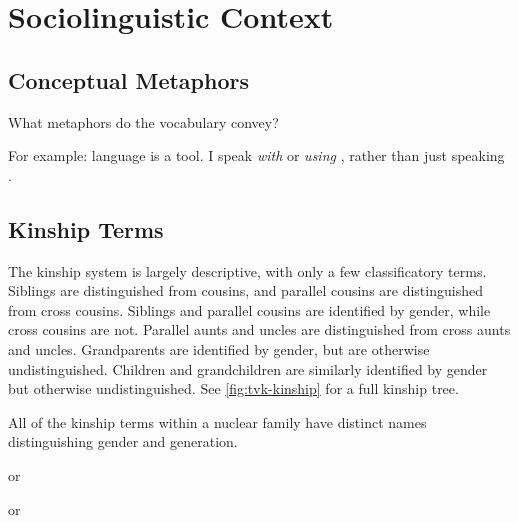 \chapter{Sociolinguistic Context}
\label{app:tvk-sociolinguistic-context}

\section{Conceptual Metaphors}
\label{sec:tvk-conceptual-metaphors}

What metaphors do the vocabulary convey?

For example: language is a tool. I speak \textit{with} or \textit{using} \langtvk, rather than just speaking \langtvk.

\section{Kinship Terms}
\label{sec:tvk-kinship-terms}

The \langtvk{} kinship system is largely descriptive, with only a few classificatory terms. Siblings are distinguished from cousins, and parallel cousins are distinguished from cross cousins. Siblings and parallel cousins are identified by gender, while cross cousins are not. Parallel aunts and uncles are distinguished from cross aunts and uncles. Grandparents are identified by gender, but are otherwise undistinguished. Children and grandchildren are similarly identified by gender but otherwise undistinguished. See \autoref{fig:tvk-kinship} for a full kinship tree.

All of the kinship terms within a nuclear family have distinct names distinguishing gender and generation.

\begin{description}[leftmargin=!,labelwidth=\widthof{\bfseries daughter}]
	\item[mother]   
	\item[father]   
	\item[parent]   
	\item[sister]   
	\item[brother]   
	\item[sibling]   
	\item[wife]    or 
	\item[husband]    or 
	\item[spouse]   
	\item[daughter]   
	\item[son]   
	\item[child]   
\end{description}


